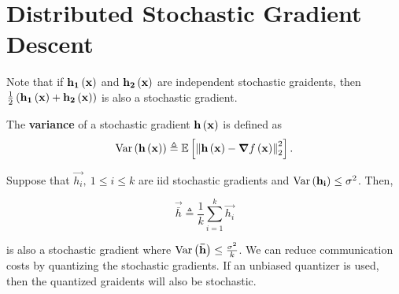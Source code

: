 \documentclass[twoside]{article}
\begin{document}



\section{Distributed Stochastic Gradient Descent}

Note that if \(\boldsymbol{\mathbf{h_1}}\left(\boldsymbol{\mathbf{x}}\right)\) and \(\boldsymbol{\mathbf{h_2}}\left(\boldsymbol{\mathbf{x}}\right)\) are
independent stochastic graidents, then \(\frac{1}{2}\left(\boldsymbol{\mathbf{h_1}}\left(\boldsymbol{\mathbf{x}}\right) + \boldsymbol{\mathbf{h_2}}\left(\boldsymbol{\mathbf{x}}\right)\right)\) is also a stochastic gradient.

\begin{definition}
    The \textbf{variance} of a stochastic gradient \(\boldsymbol{\mathbf{h}}\left(\boldsymbol{\mathbf{x}}\right)\) is
    defined as
    \begin{equation}
        \mathrm{Var}\left(\boldsymbol{\mathbf{h}}\left(\boldsymbol{\mathbf{x}}\right)\right) \triangleq \mathbb{E}\left[ \left\lVert\boldsymbol{\mathbf{h}}\left(\boldsymbol{\mathbf{x}}\right)-\boldsymbol{\mathbf{\nabla}}f\left(\boldsymbol{\mathbf{x}}\right)\right\rVert^2_2 \right].
        \label{eq:sg-var-def}
    \end{equation}
\end{definition}

Suppose that \(\vec{h_i},\ 1 \le i \le k\) are iid stochastic gradients and \(\mathrm{Var}\left(\boldsymbol{\mathbf{h_i}}\right) \le \sigma^2\). Then,

\begin{equation}
    \vec{\bar{h}} \triangleq \frac{1}{k}\sum_{i=1}^k\vec{h_i}
    \label{eq:hbar-def}
\end{equation}

is also a stochastic gradient where \(\mathrm{Var}\left(\boldsymbol{\mathbf{\bar{h}}}\right) \le \frac{\sigma^2}{k}\). 
We can reduce communication costs by quantizing the stochastic gradients. If an
unbiased quantizer is used, then the quantized graidents will also be stochastic.
\end{document}
